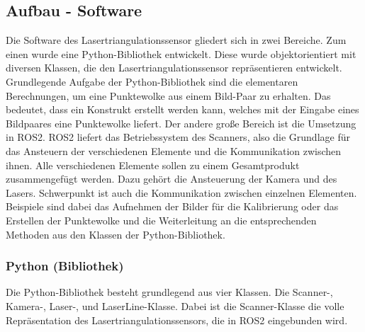 	
	\label{chap:aufbau_hardware}
	
	\newpage
	
	\subsection{Aufbau - Software}
	Die Software des Lasertriangulationssensor gliedert sich in zwei Bereiche. Zum einen wurde eine Python-Bibliothek entwickelt. Diese wurde objektorientiert mit diversen Klassen, die den Lasertriangulationssensor repräsentieren entwickelt. Grundlegende Aufgabe der Python-Bibliothek sind die elementaren Berechnungen, um eine Punktewolke aus einem Bild-Paar zu erhalten. Das bedeutet, dass ein Konstrukt erstellt werden kann, welches mit der Eingabe eines Bildpaares eine Punktewolke liefert. \newline
	Der andere große Bereich ist die Umsetzung in ROS2. ROS2 liefert das Betriebssystem des Scanners, also die Grundlage für das Ansteuern der verschiedenen Elemente und die Kommunikation zwischen ihnen. Alle verschiedenen Elemente sollen zu einem Gesamtprodukt zusammengefügt werden. Dazu gehört die Ansteuerung der Kamera und des Lasers. Schwerpunkt ist auch die Kommunikation zwischen einzelnen Elementen. Beispiele sind dabei das Aufnehmen der Bilder für die Kalibrierung oder das Erstellen der Punktewolke und die Weiterleitung an die entsprechenden Methoden aus den Klassen der Python-Bibliothek.
		\subsubsection{Python (Bibliothek)}
		Die Python-Bibliothek besteht grundlegend aus vier Klassen. Die Scanner-, Kamera-, Laser-, und LaserLine-Klasse. Dabei ist die Scanner-Klasse die volle Repräsentation des Lasertriangulationssensors, die in ROS2 eingebunden wird.
		
